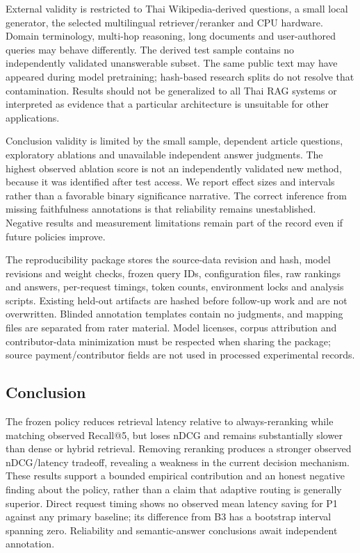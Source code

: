 External validity is restricted to Thai Wikipedia-derived questions, a
small local generator, the selected multilingual retriever/reranker and
CPU hardware. Domain terminology, multi-hop reasoning, long documents
and user-authored queries may behave differently. The derived test
sample contains no independently validated unanswerable subset. The same
public text may have appeared during model pretraining; hash-based
research splits do not resolve that contamination. Results should not be
generalized to all Thai RAG systems or interpreted as evidence that a
particular architecture is unsuitable for other applications.

Conclusion validity is limited by the small sample, dependent article
questions, exploratory ablations and unavailable independent answer
judgments. The highest observed ablation score is not an independently
validated new method, because it was identified after test access. We
report effect sizes and intervals rather than a favorable binary
significance narrative. The correct inference from missing faithfulness
annotations is that reliability remains unestablished. Negative results
and measurement limitations remain part of the record even if future
policies improve.

The reproducibility package stores the source-data revision and hash,
model revisions and weight checks, frozen query IDs, configuration
files, raw rankings and answers, per-request timings, token counts,
environment locks and analysis scripts. Existing held-out artifacts are
hashed before follow-up work and are not overwritten. Blinded annotation
templates contain no judgments, and mapping files are separated from
rater material. Model licenses, corpus attribution and contributor-data
minimization must be respected when sharing the package; source
payment/contributor fields are not used in processed experimental
records.

\hypertarget{conclusion}{%
\subsection{Conclusion}\label{conclusion}}

The frozen policy reduces retrieval latency relative to always-reranking
while matching observed Recall@5, but loses nDCG and remains
substantially slower than dense or hybrid retrieval. Removing reranking
produces a stronger observed nDCG/latency tradeoff, revealing a weakness
in the current decision mechanism. These results support a bounded
empirical contribution and an honest negative finding about the policy,
rather than a claim that adaptive routing is generally superior. Direct
request timing shows no observed mean latency saving for P1 against any
primary baseline; its difference from B3 has a bootstrap interval
spanning zero. Reliability and semantic-answer conclusions await
independent annotation.
